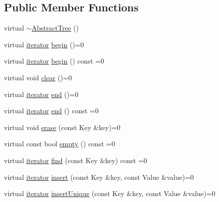 \subsection*{Public Member Functions}
\begin{DoxyCompactItemize}
\item 
virtual \hyperlink{classprism_1_1_abstract_tree_aeea049ba3035ef05b40c9aa50c04da1d}{$\sim$\+Abstract\+Tree} ()
\item 
virtual \hyperlink{classprism_1_1_abstract_tree_add0af156a67312ca397d703c531e32fd}{iterator} \hyperlink{classprism_1_1_abstract_tree_a8e03e5f6793880f0da7eaf55d6711d86}{begin} ()=0
\item 
virtual \hyperlink{classprism_1_1_abstract_tree_add0af156a67312ca397d703c531e32fd}{iterator} \hyperlink{classprism_1_1_abstract_tree_ae15b25cf84fa19e02965ce93d8ff6475}{begin} () const  =0
\item 
virtual void \hyperlink{classprism_1_1_abstract_tree_a6c286774c61d70e75d4897b989bc4be0}{clear} ()=0
\item 
virtual \hyperlink{classprism_1_1_abstract_tree_add0af156a67312ca397d703c531e32fd}{iterator} \hyperlink{classprism_1_1_abstract_tree_ac167d15fc84a60ae9bec6a2bec0ee883}{end} ()=0
\item 
virtual \hyperlink{classprism_1_1_abstract_tree_add0af156a67312ca397d703c531e32fd}{iterator} \hyperlink{classprism_1_1_abstract_tree_a104a30a25913fe65b12dc2dbf645ae5a}{end} () const  =0
\item 
virtual void \hyperlink{classprism_1_1_abstract_tree_aae004368e8a7c7fdd90579fe1c38e282}{erase} (const Key \&key)=0
\item 
virtual const bool \hyperlink{classprism_1_1_abstract_tree_a49bb10ec57e7601c000ccf8a627595e4}{empty} () const  =0
\item 
virtual \hyperlink{classprism_1_1_abstract_tree_add0af156a67312ca397d703c531e32fd}{iterator} \hyperlink{classprism_1_1_abstract_tree_ad528d55d52c9cdab11b2d5bb8ed2e54b}{find} (const Key \&key) const  =0
\item 
virtual \hyperlink{classprism_1_1_abstract_tree_add0af156a67312ca397d703c531e32fd}{iterator} \hyperlink{classprism_1_1_abstract_tree_ab3fcdae4c434f403b0ca47e879cf5760}{insert} (const Key \&key, const Value \&value)=0
\item 
virtual \hyperlink{classprism_1_1_abstract_tree_add0af156a67312ca397d703c531e32fd}{iterator} \hyperlink{classprism_1_1_abstract_tree_a7d4e3da26a96455db135c0b7206d8d16}{insert\+Unique} (const Key \&key, const Value \&value)=0
\item 

\end{DoxyCompactItemize}
